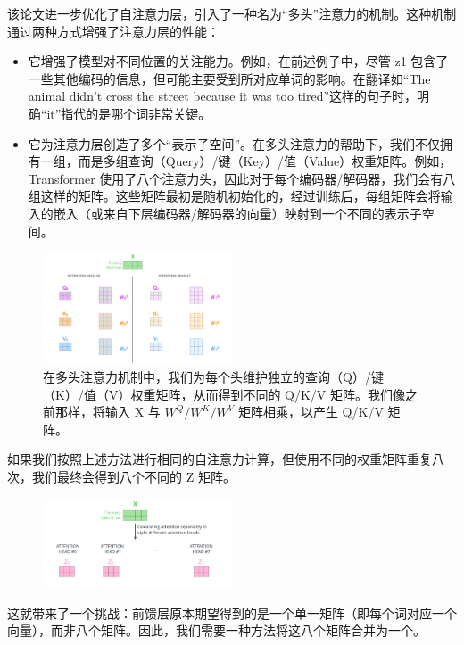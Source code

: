 \documentclass[cn,hazy,blue,10pt,normal]{elegantnote}
\begin{document}
该论文进一步优化了自注意力层，引入了一种名为“多头”注意力的机制。这种机制通过两种方式增强了注意力层的性能：
\begin{itemize}
	\item 它增强了模型对不同位置的关注能力。例如，在前述例子中，尽管 z1 包含了一些其他编码的信息，但可能主要受到所对应单词的影响。在翻译如“The animal didn't cross the street because it was too tired”这样的句子时，明确“it”指代的是哪个词非常关键。
	\item 它为注意力层创造了多个“表示子空间”。在多头注意力的帮助下，我们不仅拥有一组，而是多组查询（Query）/键（Key）/值（Value）权重矩阵。例如，Transformer 使用了八个注意力头，因此对于每个编码器/解码器，我们会有八组这样的矩阵。这些矩阵最初是随机初始化的，经过训练后，每组矩阵会将输入的嵌入（或来自下层编码器/解码器的向量）映射到一个不同的表示子空间。
\end{itemize}

\begin{figure}[ht]
	\centering
	\includegraphics[width=0.5\textwidth]{image/transformer_attention_heads_qkv.png}
	\caption{在多头注意力机制中，我们为每个头维护独立的查询（Q）/键（K）/值（V）权重矩阵，从而得到不同的 Q/K/V 矩阵。我们像之前那样，将输入 X 与 $W^Q/W^K/W^V$ 矩阵相乘，以产生 Q/K/V 矩阵。}
\end{figure}

如果我们按照上述方法进行相同的自注意力计算，但使用不同的权重矩阵重复八次，我们最终会得到八个不同的 Z 矩阵。

\begin{figure}[ht]
	\centering
	\includegraphics[width=0.5\textwidth]{image/transformer_attention_heads_z.png}
\end{figure}

这就带来了一个挑战：前馈层原本期望得到的是一个单一矩阵（即每个词对应一个向量），而非八个矩阵。因此，我们需要一种方法将这八个矩阵合并为一个。
\end{document}
